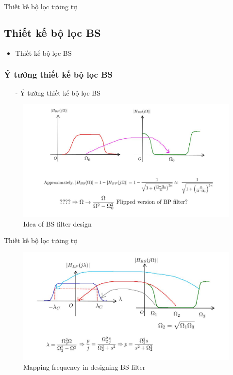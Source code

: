 \documentclass[8pt]{beamer}
\begin{document}
\begin{frame}{Thiết kế bộ lọc tương tự}
\subsection{Thiết kế bộ lọc BS}
\begin{itemize}
	\item Thiết kế bộ lọc BS
\end{itemize}
\subsubsection{Ý tưởng thiết kế bộ lọc BS}
\begin{itemize}
	\item[-] Ý tưởng thiết kế bộ lọc BS
\end{itemize}
\begin{figure}[h]
	\includegraphics[width=1\textwidth]{20.jpg}
	\caption{Idea of BS filter design}			\label{fig:re2}
		\end{figure}
\end{frame}
\begin{frame}{Thiết kế bộ lọc tương tự}
\begin{figure}[h]
	\includegraphics[width=1\textwidth]{21.jpg}
	\caption{Mapping frequency in designing BS filter}			\label{fig:re2}
		\end{figure}

\end{frame}
\end{document}
